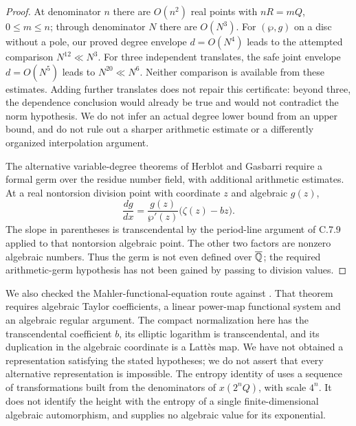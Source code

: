 \begin{proof}
At denominator $n$ there are $O(n^2)$ real points with
$nR=mQ$, $0\leq m\leq n$; through denominator $N$ there are
$O(N^3)$.  For $(\wp,g)$ on a disc without a pole, our proved
degree envelope $d=O(N^4)$ leads to the attempted comparison
$N^{12}\ll N^3$.  For three independent translates, the
safe joint envelope $d=O(N^5)$ leads to
$N^{20}\ll N^6$.  Neither comparison is available from
these estimates.  Adding further translates does not repair
this certificate: beyond three, the dependence conclusion
would already be true and would not contradict the norm
hypothesis.  We do not infer an actual degree lower bound
from an upper bound, and do not rule out a sharper arithmetic
estimate or a differently organized interpolation argument.

The alternative variable-degree theorems of Herblot and
Gasbarri require a formal germ over the residue number field,
with additional arithmetic estimates.  At a real nontorsion
division point with coordinate $z$ and algebraic $g(z)$,
\[
 \frac{dg}{dx}=\frac{g(z)}{\wp'(z)}
                         \bigl(\zeta(z)-bz\bigr).
\]
The slope in parentheses is transcendental by the period-line
argument of C.7.9 applied to that nontorsion algebraic point.
The other two factors are nonzero algebraic numbers.
Thus the germ is not even defined over $\overline{\mathbb Q}$;
the required arithmetic-germ hypothesis has not been gained
by passing to division values.
\end{proof}

We also checked the Mahler-functional-equation route against
\citet[Theorem 1.1 and system (1.2)]{adamczewski2017mahler}.
That theorem requires algebraic Taylor coefficients, a linear
power-map functional system and an algebraic regular argument.
The compact normalization here has the transcendental coefficient
$b$, its elliptic logarithm is transcendental, and its duplication
in the algebraic coordinate is a Latt\`es map.  We have not obtained
a representation satisfying the stated hypotheses; we do not
assert that every alternative representation is impossible.
The entropy identity of
\citet[Theorem 5.1]{einsiedler2001entropy} uses a sequence of
transformations built from the denominators of $x(2^nQ)$,
with scale $4^n$.  It does not identify the height with the
entropy of a single finite-dimensional algebraic automorphism,
and supplies no algebraic value for its exponential.

